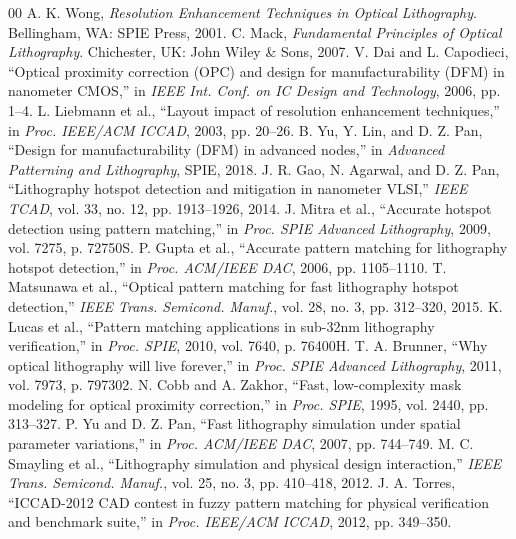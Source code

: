 \documentclass[conference]{IEEEtran}
\begin{document}
\begin{thebibliography}{00}
 A. K. Wong, \textit{Resolution Enhancement Techniques in Optical Lithography}. Bellingham, WA: SPIE Press, 2001.
 C. Mack, \textit{Fundamental Principles of Optical Lithography}. Chichester, UK: John Wiley \& Sons, 2007.
 V. Dai and L. Capodieci, ``Optical proximity correction (OPC) and design for manufacturability (DFM) in nanometer CMOS,'' in \textit{IEEE Int. Conf. on IC Design and Technology}, 2006, pp. 1--4.
 L. Liebmann et al., ``Layout impact of resolution enhancement techniques,'' in \textit{Proc. IEEE/ACM ICCAD}, 2003, pp. 20--26.
 B. Yu, Y. Lin, and D. Z. Pan, ``Design for manufacturability (DFM) in advanced nodes,'' in \textit{Advanced Patterning and Lithography}, SPIE, 2018.
 J. R. Gao, N. Agarwal, and D. Z. Pan, ``Lithography hotspot detection and mitigation in nanometer VLSI,'' \textit{IEEE TCAD}, vol. 33, no. 12, pp. 1913--1926, 2014.
 J. Mitra et al., ``Accurate hotspot detection using pattern matching,'' in \textit{Proc. SPIE Advanced Lithography}, 2009, vol. 7275, p. 72750S.
 P. Gupta et al., ``Accurate pattern matching for lithography hotspot detection,'' in \textit{Proc. ACM/IEEE DAC}, 2006, pp. 1105--1110.
 T. Matsunawa et al., ``Optical pattern matching for fast lithography hotspot detection,'' \textit{IEEE Trans. Semicond. Manuf.}, vol. 28, no. 3, pp. 312--320, 2015.
 K. Lucas et al., ``Pattern matching applications in sub-32nm lithography verification,'' in \textit{Proc. SPIE}, 2010, vol. 7640, p. 76400H.
 T. A. Brunner, ``Why optical lithography will live forever,'' in \textit{Proc. SPIE Advanced Lithography}, 2011, vol. 7973, p. 797302.
 N. Cobb and A. Zakhor, ``Fast, low-complexity mask modeling for optical proximity correction,'' in \textit{Proc. SPIE}, 1995, vol. 2440, pp. 313--327.
 P. Yu and D. Z. Pan, ``Fast lithography simulation under spatial parameter variations,'' in \textit{Proc. ACM/IEEE DAC}, 2007, pp. 744--749.
 M. C. Smayling et al., ``Lithography simulation and physical design interaction,'' \textit{IEEE Trans. Semicond. Manuf.}, vol. 25, no. 3, pp. 410--418, 2012.
 J. A. Torres, ``ICCAD-2012 CAD contest in fuzzy pattern matching for physical verification and benchmark suite,'' in \textit{Proc. IEEE/ACM ICCAD}, 2012, pp. 349--350.

\end{thebibliography}
\end{document}
